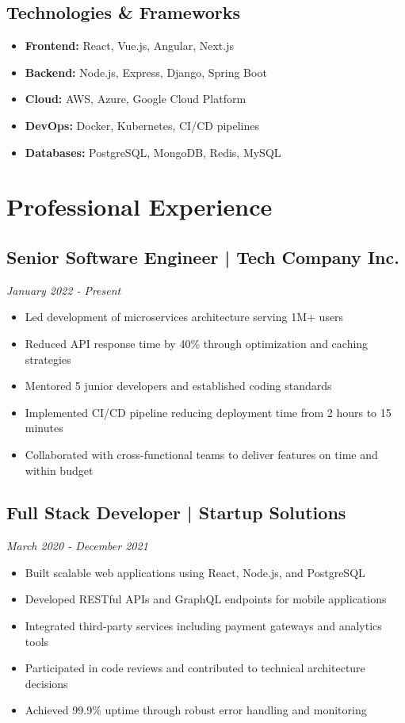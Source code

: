 \documentclass[11pt,a4paper]{article}
\begin{document}
\subsection{Technologies \& Frameworks}
\begin{itemize}
\item \textbf{Frontend:} React, Vue.js, Angular, Next.js
\item \textbf{Backend:} Node.js, Express, Django, Spring Boot
\item \textbf{Cloud:} AWS, Azure, Google Cloud Platform
\item \textbf{DevOps:} Docker, Kubernetes, CI/CD pipelines
\item \textbf{Databases:} PostgreSQL, MongoDB, Redis, MySQL
\end{itemize}

\section{Professional Experience}

\subsection{Senior Software Engineer | Tech Company Inc.}
\textit{January 2022 - Present}
\begin{itemize}
\item Led development of microservices architecture serving 1M+ users
\item Reduced API response time by 40\% through optimization and caching strategies
\item Mentored 5 junior developers and established coding standards
\item Implemented CI/CD pipeline reducing deployment time from 2 hours to 15 minutes
\item Collaborated with cross-functional teams to deliver features on time and within budget
\end{itemize}

\subsection{Full Stack Developer | Startup Solutions}
\textit{March 2020 - December 2021}
\begin{itemize}
\item Built scalable web applications using React, Node.js, and PostgreSQL
\item Developed RESTful APIs and GraphQL endpoints for mobile applications
\item Integrated third-party services including payment gateways and analytics tools
\item Participated in code reviews and contributed to technical architecture decisions
\item Achieved 99.9\% uptime through robust error handling and monitoring
\end{itemize}
\end{document}
